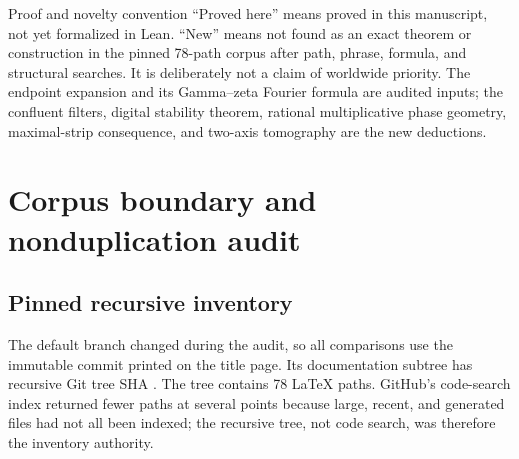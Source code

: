 \documentclass[11pt]{article}
\numberwithin{equation}{section}
\theoremstyle{definition}
\theoremstyle{remark}
\begin{document}
\begin{abstract}
Fourth, the corpus's exact Gamma--zeta formula for the leading periodic endpoint term is
shown to imply the exact maximal holomorphy strip
\[
 |\Im z|<\frac{\pi}{2\log2}.
\]
Weighted Wiener-algebra bounds then make Bell-polynomial and derivative constructions
quantitatively stable.  Combining radial multiplicative extrapolation with a discrete
Fourier transform over rational phases yields a two-axis tomography algorithm: radial
error is algebraic in the starting Lambert coordinate, while angular aliasing is
exponentially small at the sharp rate $\pi^2/\log2$.

All theorem statements are proved in the report.  Claims about natural boundaries,
optimal span--conditioning tradeoffs, irrational near-locks, and resurgent late-order
behavior are explicitly labeled conjectural.  The accompanying Python program performs
exact rational cancellation checks and high-precision Gamma--zeta experiments and
regenerates every table and figure.
\end{abstract}

\begin{statusboxPartvv}{Proof and novelty convention}
``Proved here'' means proved in this manuscript, not yet formalized in Lean.  ``New'' means
not found as an exact theorem or construction in the pinned 78-path corpus after path,
phrase, formula, and structural searches.  It is deliberately not a claim of worldwide
priority.  The endpoint expansion and its Gamma--zeta Fourier formula are audited inputs;
the confluent filters, digital stability theorem, rational multiplicative phase geometry,
maximal-strip consequence, and two-axis tomography are the new deductions.
\end{statusboxPartvv}


\clearpage

\section{Corpus boundary and nonduplication audit}
\label{p6:sec:audit}

\subsection{Pinned recursive inventory}

The default branch changed during the audit, so all comparisons use the immutable commit
printed on the title page.  Its documentation subtree has recursive Git tree SHA
.  The tree contains 78 LaTeX
paths.  GitHub's code-search index returned fewer paths at several points because large,
recent, and generated files had not all been indexed; the recursive tree, not code search,
was therefore the inventory authority.
\end{document}
